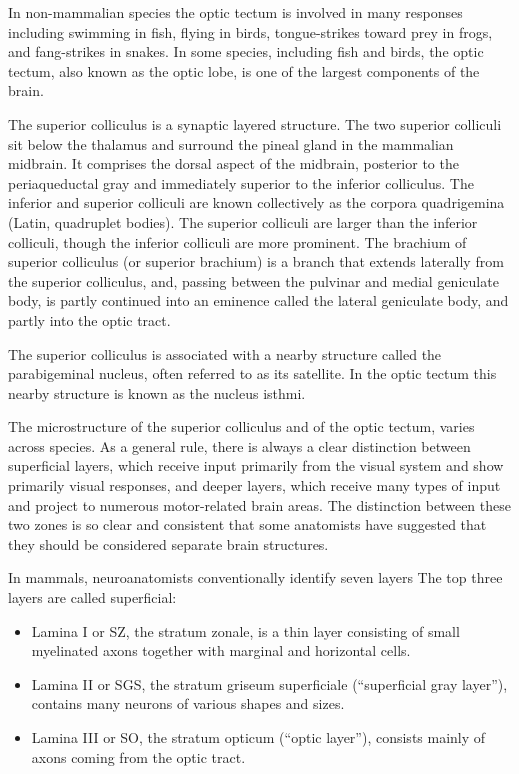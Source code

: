 \documentclass[]{book}
\providecommand{\tightlist}{%
  \setlength{\itemsep}{0pt}\setlength{\parskip}{0pt}}
\begin{document}
In non-mammalian species the optic tectum is involved in many responses including swimming in fish, flying in birds, tongue-strikes toward prey in frogs, and fang-strikes in snakes. In some species, including fish and birds, the optic tectum, also known as the optic lobe, is one of the largest components of the brain.

The superior colliculus is a synaptic layered structure. The two superior colliculi sit below the thalamus and surround the pineal gland in the mammalian midbrain. It comprises the dorsal aspect of the midbrain, posterior to the periaqueductal gray and immediately superior to the inferior colliculus. The inferior and superior colliculi are known collectively as the corpora quadrigemina (Latin, quadruplet bodies). The superior colliculi are larger than the inferior colliculi, though the inferior colliculi are more prominent. The brachium of superior colliculus (or superior brachium) is a branch that extends laterally from the superior colliculus, and, passing between the pulvinar and medial geniculate body, is partly continued into an eminence called the lateral geniculate body, and partly into the optic tract.

The superior colliculus is associated with a nearby structure called the parabigeminal nucleus, often referred to as its satellite. In the optic tectum this nearby structure is known as the nucleus isthmi.

The microstructure of the superior colliculus and of the optic tectum, varies across species. As a general rule, there is always a clear distinction between superficial layers, which receive input primarily from the visual system and show primarily visual responses, and deeper layers, which receive many types of input and project to numerous motor-related brain areas. The distinction between these two zones is so clear and consistent that some anatomists have suggested that they should be considered separate brain structures.

In mammals, neuroanatomists conventionally identify seven layers The top three layers are called superficial:

\begin{itemize}
\tightlist
\item
  Lamina I or SZ, the stratum zonale, is a thin layer consisting of small myelinated axons together with marginal and horizontal cells.
\item
  Lamina II or SGS, the stratum griseum superficiale (``superficial gray layer''), contains many neurons of various shapes and sizes.
\item
  Lamina III or SO, the stratum opticum (``optic layer''), consists mainly of axons coming from the optic tract.
\end{itemize}
\end{document}
